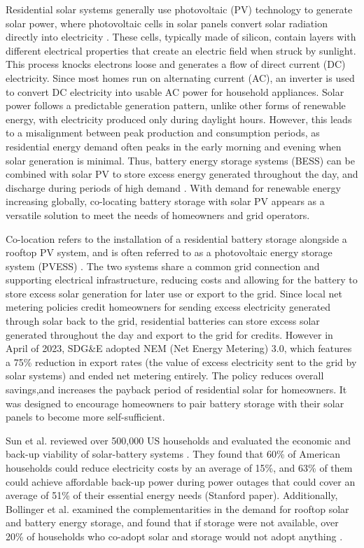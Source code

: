 \documentclass[14pt, final,numbered]{ifacconf}
\begin{document}
Residential solar systems generally use photovoltaic (PV) technology to generate solar power, where photovoltaic cells in solar panels convert solar radiation directly into electricity \cite{bagalini2019solar}. These cells, typically made of silicon, contain layers with different electrical properties that create an electric field when struck by sunlight. This process knocks electrons loose and generates a flow of direct current (DC) electricity. Since most homes run on alternating current (AC), an inverter is used to convert DC electricity into usable AC power for household appliances. Solar power follows a predictable generation pattern, unlike other forms of renewable energy, with electricity produced only during daylight hours. However, this leads to a misalignment between peak production and consumption periods, as residential energy demand often peaks in the early morning and evening when solar generation is minimal. Thus, battery energy storage systems (BESS) can be combined with solar PV to store excess energy generated throughout the day, and discharge during periods of high demand \cite{scanu2024solar}. With demand for renewable energy increasing globally, co-locating battery storage with solar PV appears as a versatile solution to meet the needs of homeowners and grid operators. 

Co-location refers to the installation of a residential battery storage alongside a rooftop PV system, and is often referred to as a photovoltaic energy storage system (PVESS) \cite{scanu2024solar}. The two systems share a common grid connection and supporting electrical infrastructure, reducing costs and allowing for the battery to store excess solar generation for later use or export to the grid. Since local net metering policies credit homeowners for sending excess electricity generated through solar back to the grid, residential batteries can store excess solar generated throughout the day and export to the grid for credits. However in April of 2023, SDG\&E adopted NEM (Net Energy Metering) 3.0, which features a 75\% reduction in export rates (the value of excess electricity sent to the grid by solar systems) and ended net metering entirely. The policy reduces overall savings,and increases the payback period of residential solar for homeowners. It was designed to encourage homeowners to pair battery storage with their solar panels to become more self-sufficient. 

Sun et al. reviewed over 500,000 US households  and evaluated the economic and back-up viability of solar-battery systems \cite{sun2025solar}. They found that 60\% of American households could reduce electricity costs by an average of 15\%, and 63\% of them could achieve affordable back-up power during power outages that could cover an average of 51\% of their essential energy needs (Stanford paper). Additionally, Bollinger et al. examined the complementarities in the demand for rooftop solar and battery energy storage, and found that if storage were not available, over 20\% of households who co-adopt solar and storage would not adopt anything \cite{bollinger2023valuing}. 
\end{document}
